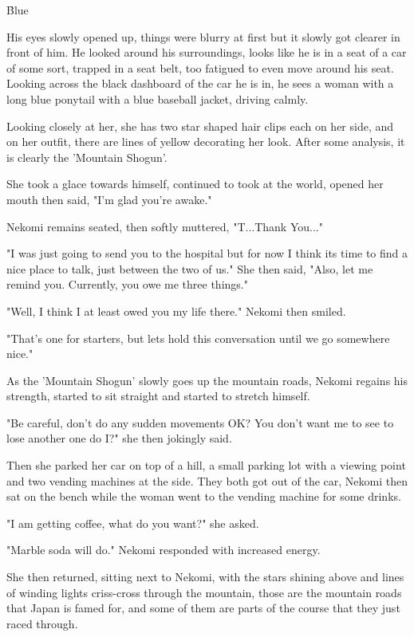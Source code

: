 \h{Blue}

His eyes slowly opened up, things were blurry at first but it slowly got clearer in front of him. He looked around his surroundings, looks like he is in a seat of a car of some sort, trapped in a seat belt, too fatigued to even move around his seat. Looking across the black dashboard of the car he is in, he sees a woman with a long blue ponytail with a blue baseball jacket, driving calmly.

Looking closely at her, she has two star shaped hair clips each on her side, and on her outfit, there are lines of yellow decorating her look. After some analysis, it is clearly the 'Mountain Shogun'.

She took a glace towards himself, continued to took at the world, opened her mouth then said, "I'm glad you're awake."

Nekomi remains seated, then softly muttered, "T...Thank You..."

"I was just going to send you to the hospital but for now I think its time to find a nice place to talk, just between the two of us." She then said, "Also, let me remind you. Currently, you owe me three things."

"Well, I think I at least owed you my life there." Nekomi then smiled.

"That's one for starters, but lets hold this conversation until we go somewhere nice."

As the 'Mountain Shogun' slowly goes up the mountain roads, Nekomi regains his strength, started to sit straight and started to stretch himself.

"Be careful, don't do any sudden movements OK? You don't want me to see to lose another one do I?" she then jokingly said.

Then she parked her car on top of a hill, a small parking lot with a viewing point and two vending machines at the side. They both got out of the car, Nekomi then sat on the bench while the woman went to the vending machine for some drinks.

"I am getting coffee, what do you want?" she asked.

"Marble soda will do." Nekomi responded with increased energy.

She then returned, sitting next to Nekomi, with the stars shining above and lines of winding lights criss-cross through the mountain, those are the mountain roads that Japan is famed for, and some of them are parts of the course that they just raced through.


